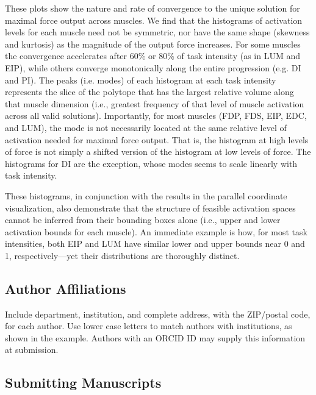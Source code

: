 \documentclass[9pt,twocolumn,twoside,lineno]{pnas-new}
\begin{document}
These plots show the nature and rate of convergence to the unique solution for maximal force output across muscles.
We find that the histograms of activation levels for each muscle need not be symmetric, nor have the same shape (skewness and kurtosis) as the magnitude of the output force increases.
For some muscles the convergence accelerates after 60\% or 80\% of task intensity (as in LUM and EIP), while others converge monotonically along the entire progression (e.g. DI and PI).
The peaks (i.e. modes) of each histogram at each task intensity represents the slice of the polytope that has the largest relative volume along that muscle dimension (i.e., greatest frequency of that level of muscle activation across all valid solutions). Importantly, for most muscles (FDP, FDS, EIP, EDC, and LUM), the mode is not necessarily located at the same relative level of activation needed for maximal force output. That is, the histogram at high levels of force is not simply a shifted version of the histogram at low levels of force. The histograms for DI are the exception, whose modes seems to scale linearly with task intensity.

These histograms, in conjunction with the results in the parallel coordinate visualization, also demonstrate that the structure of feasible activation spaces cannot be inferred from their bounding boxes alone (i.e., upper and lower activation bounds for each muscle).
An immediate example is how, for most task intensities, both EIP and LUM have similar lower and upper bounds near 0 and 1, respectively---yet their distributions are thoroughly distinct.






\subsection*{Author Affiliations}

Include department, institution, and complete address, with the ZIP/postal code, for each author. Use lower case letters to match authors with institutions, as shown in the example. Authors with an ORCID ID may supply this information at submission.

\subsection*{Submitting Manuscripts}
\end{document}
